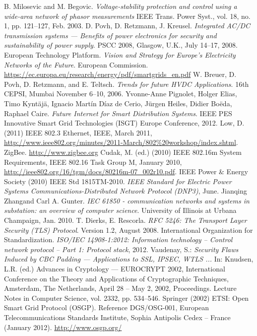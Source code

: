 \documentclass[11pt,oneside]{book}
\begin{document}
\begin{thebibliography}{99}
 B. Milosevic and M. Begovic. \emph{Voltage-stability protection and control using a wide-area network of phasor measurements} IEEE Trans. Power Syst., vol. 18, no. 1, pp. 121–127, Feb. 2003. 
 D. Povh, D. Retzmann, J. Kreusel. \emph{Integrated AC/DC transmission systems — Benefits of power electronics for security and sustainability of power supply}. PSCC 2008, Glasgow, U.K., July 14–17, 2008. 
 European Technology Platform. \emph{Vision and Strategy for Europe’s Electricity Networks of the Future}. European Commission. \url{https://ec.europa.eu/research/energy/pdf/smartgrids_en.pdf}
 W. Breuer, D. Povh, D. Retzmann, and E. Teltsch. \emph{Trends for future HVDC Applications}. 16th CEPSI, Mumbai November 6–10, 2006.
 Yvonne-Anne Pignolet, Holger Elias, Timo Kyntäjä, Ignacio Martín Díaz de Cerio, Jürgen Heiles, Didier Boëda, Raphael Caire. \emph{Future Internet for Smart Distribution Systems}. IEEE PES Innovative Smart Grid Technologies (ISGT) Europe Conference, 2012.
 Low, D. (2011) IEEE 802.3 Ethernet, IEEE, March 2011, \url{http://www.ieee802.org/minutes/2011-March/802\%20workshop/index.shtml}.
 ZigBee. \url{http://www.zigbee.org}
 Cudak, M. (ed.) (2010) IEEE 802.16m System Requirements, IEEE 802.16 Task Group M, January 2010, \url{http://ieee802.org/16/tgm/docs/80216m-07_002r10.pdf}.
 IEEE Power \& Energy Society (2010) IEEE Std 1815TM-2010. \emph{IEEE Standard for Electric Power Systems Communications-Distributed Network Protocol (DNP3)}, June.
 Jianqing Zhangand Carl A. Gunter. \emph{IEC 61850 - communication networks and systems in substation: an overview of computer science}.
University of Illinois at Urbana Champaign, Jan. 2010.
 T. Dierks, E. Rescorla. \emph{RFC 5246: The Transport Layer Security (TLS) Protocol}. Version 1.2, August 2008.
 International Organization for Standardization. \emph{ISO/IEC 14908-1:2012: Information technology – Control network protocol – Part 1: Protocol stack}, 2012.
 Vaudenay, S.: \emph{Security Flaws Induced by CBC Padding — Applications to SSL, IPSEC, WTLS ... }In: Knudsen, L.R. (ed.) Advances in Cryptology — EUROCRYPT 2002, International Conference on the Theory and Applications of Cryptographic Techniques, Amsterdam, The Netherlands, April 28 – May 2, 2002, Proceedings. Lecture Notes in Computer Science, vol. 2332, pp. 534–546. Springer (2002)
 ETSI: Open Smart Grid Protocol (OSGP). Reference DGS/OSG-001, European Telecommunications Standards Institute, Sophia Antipolis Cedex – France (January 2012). \url{http://www.osgp.org/}

\end{thebibliography}
\end{document}
